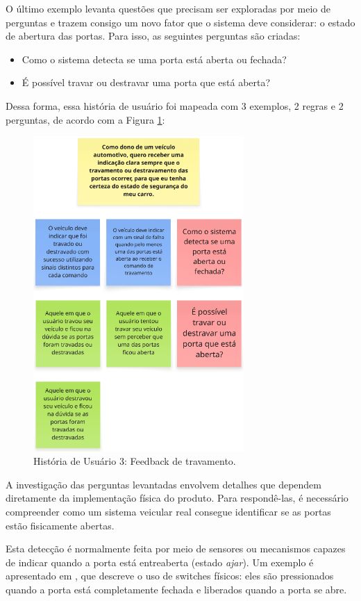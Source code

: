 O último exemplo levanta questões que precisam ser exploradas por meio de perguntas e trazem consigo um novo fator que o sistema deve considerar: o estado de 
abertura das portas. Para isso, as seguintes perguntas são criadas:

\begin{itemize}
    \item Como o sistema detecta se uma porta está aberta ou fechada?
    \item É possível travar ou destravar uma porta que está aberta?
\end{itemize}

Dessa forma, essa história de usuário foi mapeada com 3 exemplos, 2 regras e 2 perguntas, de acordo com a Figura \ref{fig:historia3}:

\begin{figure}[H]
\centering
\includegraphics[height=12cm]{figuras/user_story_3.png}
\caption{História de Usuário 3: Feedback de travamento.}
\label{fig:historia3}
\end{figure}

A investigação das perguntas levantadas envolvem detalhes que dependem diretamente da implementação física do produto. Para respondê-las, é necessário 
compreender como um sistema veicular real consegue identificar se as portas estão fisicamente abertas.

Esta detecção é normalmente feita por meio de sensores ou mecanismos capazes de indicar quando a porta está entreaberta (estado \textit{ajar}). Um exemplo é 
apresentado em , que descreve o uso de switches físicos: eles são pressionados quando a porta está completamente fechada e liberados 
quando a porta se abre. 


